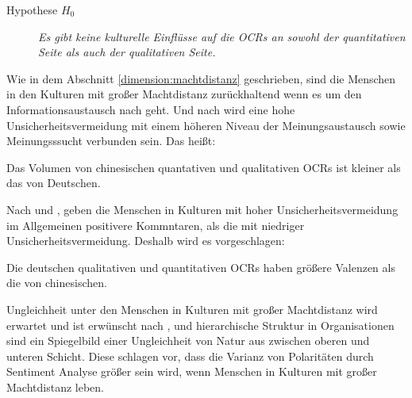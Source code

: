 \begin{description}
    \item[Hypothese $H_0$] \emph{Es gibt keine kulturelle Einflüsse auf die \acl{OCRs} an sowohl der quantitativen Seite als auch der qualitativen Seite.}
\label{hyp:0}
\end{description}

Wie in dem Abschnitt \ref{dimension:machtdistanz} geschrieben, sind die Menschen in den Kulturen mit großer Machtdistanz zurückhaltend wenn es um den Informationsaustausch nach \citet{Lam2009} geht. Und nach \citet{Lam2009, liu2001relationships, dawar1996cross, money1998explorations} wird eine hohe Unsicherheitsvermeidung mit einem höheren Niveau der Meinungsaustausch sowie Meinungsssucht verbunden sein. Das heißt: %
\begin{hyp} 
Das Volumen von chinesischen quantativen und qualitativen \acl{OCRs} ist kleiner als das von Deutschen.
\label{hyp:1}
\end{hyp}

Nach \citet{liu2001relationships} und \citet{donthu1998cultural}, geben die Menschen in Kulturen mit hoher Unsicherheitsvermeidung im Allgemeinen positivere Kommntaren, als die mit niedriger Unsicherheitsvermeidung. Deshalb wird es vorgeschlagen:
\begin{hyp} 
Die deutschen qualitativen und quantitativen \acl{OCRs} haben größere Valenzen als die von chinesischen.
\label{hyp:2}
\end{hyp}

Ungleichheit unter den Menschen in Kulturen mit großer Machtdistanz wird erwartet und ist erwünscht nach \citet{hofstede2013interkulturelle}, und hierarchische Struktur in Organisationen sind ein Spiegelbild einer Ungleichheit von Natur aus zwischen oberen und unteren Schicht. Diese schlagen vor, dass die Varianz von Polaritäten durch Sentiment Analyse größer sein wird, wenn Menschen in Kulturen mit großer Machtdistanz leben.

